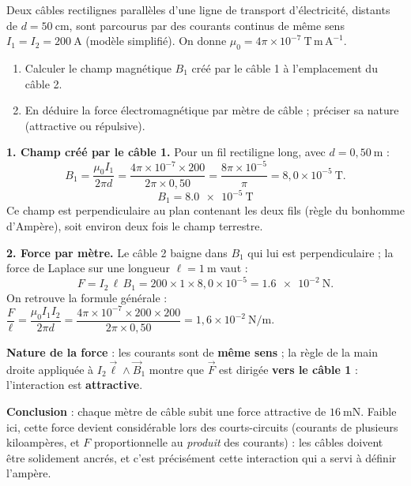 \documentclass[11pt]{article}
\begin{document}
\begin{exoresolu}
Deux câbles rectilignes parallèles d'une ligne de transport d'électricité, distants de $d = 50\ \mathrm{cm}$, sont parcourus par des courants continus de même sens $I_1 = I_2 = 200\ \mathrm{A}$ (modèle simplifié). On donne $\mu_0 = 4\pi\times 10^{-7}\ \mathrm{T\,m\,A^{-1}}$.
\begin{enumerate}
\item Calculer le champ magnétique $B_1$ créé par le câble 1 à l'emplacement du câble 2.
\item En déduire la force électromagnétique par mètre de câble ; préciser sa nature (attractive ou répulsive).
\end{enumerate}
\tcblower
\textbf{1. Champ créé par le câble 1.} Pour un fil rectiligne long, avec $d = 0,50\ \mathrm{m}$ :
\[ B_1 = \dfrac{\mu_0 I_1}{2\pi d} = \dfrac{4\pi\times 10^{-7} \times 200}{2\pi \times 0,50} = \dfrac{8\pi\times 10^{-5}}{\pi} = 8,0\times 10^{-5}\ \mathrm{T}. \]
\[ \boxed{B_1 = \num{8,0e-5}\ \mathrm{T}} \]
Ce champ est perpendiculaire au plan contenant les deux fils (règle du bonhomme d'Ampère), soit environ deux fois le champ terrestre.

\textbf{2. Force par mètre.} Le câble 2 baigne dans $B_1$ qui lui est perpendiculaire ; la force de Laplace sur une longueur $\ell = 1\ \mathrm{m}$ vaut :
\[ F = I_2\,\ell\,B_1 = 200 \times 1 \times 8,0\times 10^{-5} = \num{1,6e-2}\ \mathrm{N}. \]
On retrouve la formule générale : $\dfrac{F}{\ell} = \dfrac{\mu_0 I_1 I_2}{2\pi d} = \dfrac{4\pi\times 10^{-7}\times 200\times 200}{2\pi\times 0,50} = 1,6\times 10^{-2}\ \mathrm{N/m}$.

\textbf{Nature de la force} : les courants sont de \textbf{même sens} ; la règle de la main droite appliquée à $I_2\vec{\ell}\wedge\vec{B}_1$ montre que $\vec{F}$ est dirigée \textbf{vers le câble 1} : l'interaction est \textbf{attractive}.

\textbf{Conclusion} : chaque mètre de câble subit une force attractive de $16\ \mathrm{mN}$. Faible ici, cette force devient considérable lors des courts-circuits (courants de plusieurs kiloampères, et $F$ proportionnelle au \emph{produit} des courants) : les câbles doivent être solidement ancrés, et c'est précisément cette interaction qui a servi à définir l'ampère.
\end{exoresolu}
\end{document}
